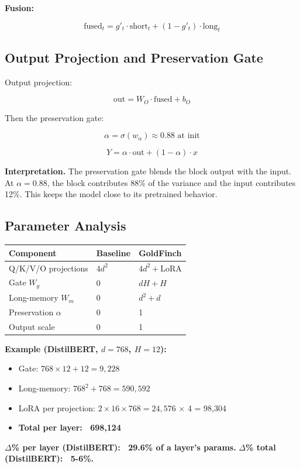 \textbf{Fusion:}

\[
\text{fused}_t = g'_t \cdot \text{short}_t + (1 - g'_t) \cdot \text{long}_t
\tag{4.8}
\]

\subsection{Output Projection and Preservation Gate}

Output projection:

\[
\text{out} = W_O \cdot \text{fused} + b_O
\tag{4.9}
\]

Then the preservation gate:

\[
\alpha = \sigma(w_\alpha) \approx 0.88 \text{ at init}
\tag{4.10}
\]

\[
Y = \alpha \cdot \text{out} + (1 - \alpha) \cdot x
\tag{4.11}
\]

\textbf{Interpretation.} The preservation gate blends the block output with the 
input. At $\alpha = 0.88$, the block contributes 88\% of the variance and 
the input contributes 12\%. This keeps the model close to its pretrained 
behavior.

\subsection{Parameter Analysis}

\begin{table}[H]
\centering
\small
\begin{tabular}{lll}
\toprule
\textbf{Component} & \textbf{Baseline} & \textbf{GoldFinch} \\
\midrule
Q/K/V/O projections & $4 d^2$ & $4 d^2 + \text{LoRA}$ \\
Gate $W_g$ & 0 & $d H + H$ \\
Long-memory $W_m$ & 0 & $d^2 + d$ \\
Preservation $\alpha$ & 0 & 1 \\
Output scale & 0 & 1 \\
\bottomrule
\end{tabular}
\end{table}

\textbf{Example (DistilBERT, $d = 768$, $H = 12$):}
\begin{itemize}
\item Gate: $768 \times 12 + 12 = 9{,}228$
\item Long-memory: $768^2 + 768 = 590{,}592$
\item LoRA per projection: $2 \times 16 \times 768 = 24{,}576$ $\times$ 4 = 98,304
\item \textbf{Total per layer: ~698,124}

\end{itemize}
\textbf{$\Delta$\% per layer (DistilBERT): ~29.6\% of a layer's params.}
\textbf{$\Delta$\% total (DistilBERT): ~5-6\%.}


